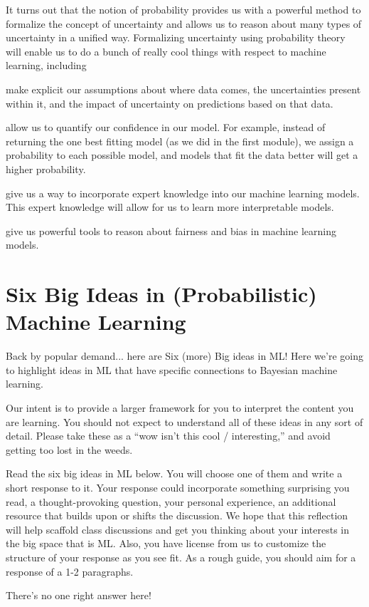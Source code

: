 \documentclass[assignment01_Solutions]{subfiles}
\begin{document}
It turns out that the notion of probability provides us with a powerful method to formalize the concept of uncertainty and allows us to reason about many types of uncertainty in a unified way.  Formalizing uncertainty using probability theory will enable us to do a bunch of really cool things with respect to machine learning, including

\bi
\item make explicit our assumptions about where data comes, the uncertainties present within it, and the impact of uncertainty on predictions based on that data.
\item allow us to quantify our confidence in our model.  For example, instead of returning the one best fitting model (as we did in the first module), we assign a probability to each possible model, and models that fit the data better will get a higher probability.
\item give us a way to incorporate expert knowledge into our machine learning models.  This expert knowledge will allow for us to learn more interpretable models.
\item give us powerful tools to reason about fairness and bias in machine learning models.
\ei

\section{Six Big Ideas in (Probabilistic) Machine Learning}
Back by popular demand... here are Six (more) Big ideas in ML!  Here we're going to highlight ideas in ML that have specific connections to Bayesian machine learning.

\begin{notice}
Our intent is to provide a larger framework for you to interpret the content you are learning.  You should not expect to understand all of these ideas in any sort of detail.  Please take these as a ``wow isn't this cool / interesting,'' and avoid getting too lost in the weeds.
\end{notice}


\begin{exercise}
Read the six big ideas in ML below.  You will choose one of them and write a short response to it.  Your response could incorporate something surprising you read, a thought-provoking question, your personal experience, an additional resource that builds upon or shifts the discussion.  We hope that this reflection will help scaffold class discussions and get you thinking about your interests in the big space that is ML.  Also, you have license from us to customize the structure of your response as you see fit.  As a rough guide, you should aim for a response of a 1-2 paragraphs.

\begin{boxedsolution}
There's no one right answer here!
\end{boxedsolution}
\end{exercise}
\end{document}

